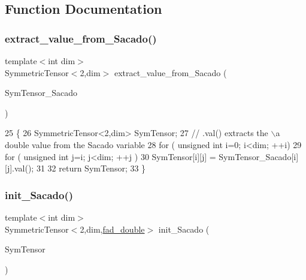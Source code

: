 \subsection{Function Documentation}
\mbox{\label{Sacado-auxiliary__functions_8h_aad3b558b1d45add85343228c2a2146f6}} 
\subsubsection{\texorpdfstring{extract\+\_\+value\+\_\+from\+\_\+\+Sacado()}{extract\_value\_from\_Sacado()}}
{\footnotesize\ttfamily template$<$int dim$>$ \\
Symmetric\+Tensor$<$2,dim$>$ extract\+\_\+value\+\_\+from\+\_\+\+Sacado (\begin{DoxyParamCaption}\item[{const Symmetric\+Tensor$<$ 2, dim, \hyperlink{Sacado-auxiliary__functions_8h_a868b94676739e612d9c95940e70892a9}{fad\+\_\+double} $>$ \&}]{Sym\+Tensor\+\_\+\+Sacado }\end{DoxyParamCaption})}


\begin{DoxyCode}
25 \{
26     SymmetricTensor<2,dim> SymTensor;
27     \textcolor{comment}{// .val() extracts the \(\backslash\)a double value from the Sacado variable}
28      \textcolor{keywordflow}{for} ( \textcolor{keywordtype}{unsigned} \textcolor{keywordtype}{int} i=0; i<dim; ++i)
29         \textcolor{keywordflow}{for} ( \textcolor{keywordtype}{unsigned} \textcolor{keywordtype}{int} j=i; j<dim; ++j )
30             SymTensor[i][j] = SymTensor\_Sacado[i][j].val();
31      
32      \textcolor{keywordflow}{return} SymTensor;
33 \}
\end{DoxyCode}
\mbox{\label{Sacado-auxiliary__functions_8h_a05eaab6eac85b896a69c4fc2984628bc}} 
\subsubsection{\texorpdfstring{init\+\_\+\+Sacado()}{init\_Sacado()}}
{\footnotesize\ttfamily template$<$int dim$>$ \\
Symmetric\+Tensor$<$2,dim,\hyperlink{Sacado-auxiliary__functions_8h_a868b94676739e612d9c95940e70892a9}{fad\+\_\+double}$>$ init\+\_\+\+Sacado (\begin{DoxyParamCaption}\item[{const Symmetric\+Tensor$<$ 2, dim, double $>$ \&}]{Sym\+Tensor }\end{DoxyParamCaption})}


